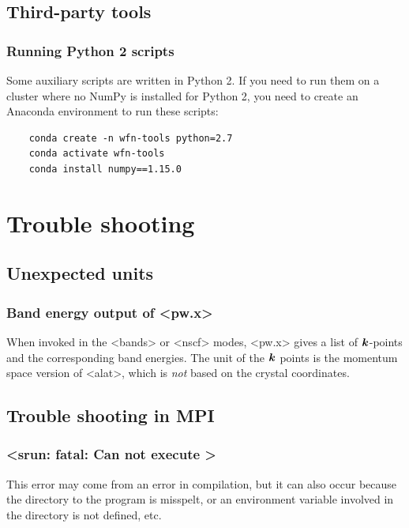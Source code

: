 \documentclass[hyperref, a4paper, 12pt]{report}
\def\texttt#1{<#1>}%
\newcommand{\shortcode}[1]{\texttt{#1}}
\begin{document}
\section{Third-party tools}

\subsection{Running Python 2 scripts}

Some auxiliary scripts are written in Python 2. 
If you need to run them on a cluster 
where no NumPy is installed for Python 2, 
you need to create an Anaconda environment
to run these scripts:
\begin{lstlisting}
    conda create -n wfn-tools python=2.7
    conda activate wfn-tools
    conda install numpy==1.15.0
\end{lstlisting}

\chapter{Trouble shooting}

\section{Unexpected units}

\subsection{Band energy output of \shortcode{pw.x}}

When invoked in the \shortcode{bands} or \shortcode{nscf} modes, 
\shortcode{pw.x} gives a list of $\vb*{k}$-points 
and the corresponding band energies. 
The unit of the $\vb*{k}$ points is the momentum space version of \shortcode{alat},
which is \emph{not} based on the crystal coordinates.

\section{Trouble shooting in MPI}

\subsection{\shortcode{srun: fatal: Can not execute }}

This error may come from an error in compilation,
but it can also occur because the directory to the program is misspelt,
or an environment variable involved in the directory is not defined, etc. 
\end{document}
